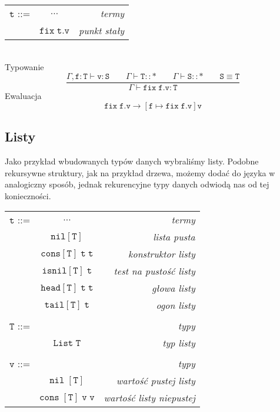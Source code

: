 \documentclass[11pt,leqno]{article}
\begin{document}
\begin{tabular}{| l c r |}
  \hline
  $\mathtt{t}$ ::= & $\dots$ & \textit{termy}  \\
   & $\mathtt{fix \;t.v}$ & \textit{punkt stały}\\
  \hline
\end{tabular} \\

Typowanie \\
 	\[\mathtt{\frac{\Gamma, f:T \vdash v:S \hspace{2em} \Gamma \vdash T::\ast\hspace{2em} \Gamma \vdash S::\ast \hspace{2em} S\equiv T}{\Gamma \vdash fix\;f.v:T}}
	\]
Ewaluacja \\
 	\[\mathtt{ fix\;f.v \longrightarrow [f \mapsto fix\;f.v]v
		}
	\]

\subsection{Listy}

Jako przykład wbudowanych typów danych wybraliśmy listy. Podobne rekursywne struktury, jak na przykład drzewa, możemy dodać do języka w analogiczny sposób, jednak rekurencyjne typy danych odwiodą nas od tej konieczności. \\
  
\begin{tabular}{| l c r |}
  \hline
  $\mathtt{t}$ ::= & $\dots$ & \textit{termy}  \\
   & $\mathtt{nil[T]}$ & \textit{lista pusta}  \\
   & $\mathtt{cons[T]\;t\;t}$ & \textit{konstruktor listy} \\
   & $\mathtt{isnil[T]\;t}$ & \textit{test na pustość listy} \\
   & $\mathtt{head[T]\;t\;t}$ & \textit{głowa listy} \\
   & $\mathtt{tail[T]\;t}$ & \textit{ogon listy} \\
   & & \\
  $\mathtt{T}$ ::= &  & \textit{typy} \\
   & $\mathtt{List\;T}$ & \textit{typ listy} \\
   & & \\
  $\mathtt{v}$ ::= &  & \textit{typy} \\
   & $\mathtt{nil\;[T]}$ & \textit{wartość pustej listy} \\
   & $\mathtt{cons\;[T]\;v\;v}$ & \textit{wartość listy niepustej} \\
  \hline
\end{tabular} \\
\end{document}
